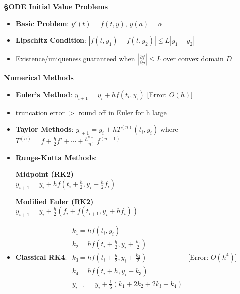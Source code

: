 \documentclass{article}
\begin{document}
\begin{minipage}[t]{0.49\textwidth}
\textbf{\S ODE Initial Value Problems}
\begin{itemize}
\item \textbf{Basic Problem}: $y'(t) = f(t,y)$, $y(a) = \alpha$
\item \textbf{Lipschitz Condition}: $|f(t,y_1) - f(t,y_2)| \leq L|y_1 - y_2|$ 
\item Existence/uniqueness guaranteed when $|\frac{\partial f}{\partial y}| \leq L$ over convex domain $D$
\end{itemize}

\textbf{Numerical Methods}
\begin{itemize}
\item \textbf{Euler's Method}: $y_{i+1} = y_i + hf(t_i,y_i)$ [Error: $O(h)$]
\item truncation error $>$ round off in Euler for h large
\item \textbf{Taylor Methods}: $y_{i+1} = y_i + hT^{(n)}(t_i,y_i)$ where 
$T^{(n)} = f + \frac{h}{2}f' + \cdots + \frac{h^{n-1}}{n!}f^{(n-1)}$
\item \textbf{Runge-Kutta Methods}:\\
\begin{minipage}[t]{0.45\textwidth}
    \textbf{Midpoint (RK2)}\\
    $y_{i+1} = y_i + hf(t_i+\frac{h}{2}, y_i+\frac{h}{2}f_i)$
\end{minipage}
\hfill
\begin{minipage}[t]{0.45\textwidth}
    \textbf{Modified Euler (RK2)}\\
    $y_{i+1} = y_i + \frac{h}{2}(f_i + f(t_{i+1},y_i+hf_i))$
\end{minipage}

\item \textbf{Classical RK4}:
$\begin{array}{l}
k_1 = hf(t_i,y_i) \\
k_2 = hf(t_i+\frac{h}{2},y_i+\frac{k_1}{2}) \\
k_3 = hf(t_i+\frac{h}{2},y_i+\frac{k_2}{2}) \\
k_4 = hf(t_i+h,y_i+k_3) \\
y_{i+1} = y_i + \frac{1}{6}(k_1 + 2k_2 + 2k_3 + k_4)
\end{array}$
[Error: $O(h^4)$]
\end{itemize}
\end{minipage}
\hfill
\end{document}
